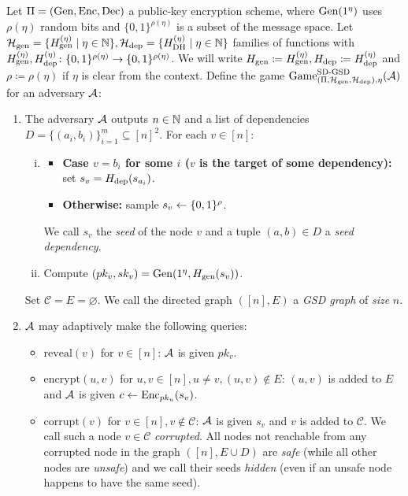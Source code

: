 \begin{definition} \label{def:sd-gsd-game}
	Let $\Pi = (\mathrm{Gen}, \mathrm{Enc}, \mathrm{Dec})$ a public-key encryption scheme, where $\mathrm{Gen}(1^\eta)$ uses $\rho(\eta)$ random bits and $\{0, 1\}^{\rho(\eta)}$ is a subset of the message space.
	Let $\mathcal{H}_\mathrm{gen} = \{ H_\mathrm{gen}^{(\eta)} \mid \eta \in \mathbb{N}\}, \mathcal{H}_\mathrm{dep} = \{ H_\mathrm{DH}^{(\eta)} \mid \eta \in \mathbb{N}\}$ families of functions with $H_\mathrm{gen}^{(\eta)}, H_\mathrm{dep}^{(\eta)} \colon \{0, 1\}^{\rho(\eta)} \to \{0, 1\}^{\rho(\eta)}$. We will write $H_\mathrm{gen} \coloneqq H_\mathrm{gen}^{(\eta)}, H_\mathrm{dep} \coloneqq H_\mathrm{dep}^{(\eta)}$ and $\rho \coloneqq \rho(\eta)$ if $\eta$ is clear from the context.
	Define the game $\mathrm{Game}_{(\Pi, \mathcal{H}_\mathrm{gen}, \mathcal{H}_\mathrm{dep}), \eta}^{\mathrm{SD\text{-}GSD}}(\mathcal{A})$ for an adversary $\mathcal{A}$:
	\begin{enumerate}[1.]
		\item \label{def:sd-gsd-game-step-init} The adversary $\mathcal{A}$ outputs $n \in \mathbb{N}$ and a list of dependencies $D = \{(a_{i}, b_{i})\}_{i=1}^m \subseteq [n]^2$. For each $v \in [n]$:
		      \begin{enumerate}[(i)]
			      \item \begin{itemize}
				            \item \textbf{Case $v = b_i$ for some $i$ ($v$ is the target of some dependency):} set $s_v = H_\mathrm{dep}(s_{a_i})$.
				            \item \textbf{Otherwise:} sample $s_v \leftarrow \{0, 1\}^\rho$.
			            \end{itemize}
			            We call $s_v$ the \emph{seed} of the node $v$ and a tuple $(a, b) \in D$ a \emph{seed dependency}.
			      \item Compute $(pk_v, sk_v) = \mathrm{Gen}(1^\eta, H_\mathrm{gen}(s_v))$.
		      \end{enumerate}
		      Set $\mathcal{C} = E = \varnothing$. We call the directed graph $([n], E)$ a \emph{GSD graph} of \emph{size} $n$.
		\item $\mathcal{A}$ may adaptively make the following queries:
		      \begin{itemize}
			      \item $\mathrm{reveal}(v)$ for $v \in [n]$: $\mathcal{A}$ is given $pk_v$.
			      \item $\mathrm{encrypt}(u, v)$ for $u, v \in [n], u \neq v, (u, v) \notin E$: $(u, v)$ is added to $E$ and $\mathcal{A}$ is given $c \leftarrow \mathrm{Enc}_{pk_u}(s_v)$.
			      \item $\mathrm{corrupt}(v)$ for $v \in [n], v \notin \mathcal{C}$: $\mathcal{A}$ is given $s_v$ and $v$ is added to $\mathcal{C}$. We call such a node $v \in \mathcal{C}$ \emph{corrupted}. All nodes not reachable from any corrupted node in the graph $([n], E \cup D)$ are \emph{safe} (while all other nodes are \emph{unsafe}) and we call their seeds \emph{hidden} (even if an unsafe node happens to have the same seed).

\end{itemize}
\end{enumerate}
\end{definition}
